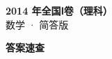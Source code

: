 \documentclass[zihao=-4, a4paper]{ctexart}
\begin{document}
\begin{center}
  {\Large\bfseries 2014 年全国Ⅰ卷（理科）}\\[4pt]
  {\large 数学 · 简答版}
\end{center}
\medskip
{}

\clearpage
{}
\begin{center}{\Large\bfseries 答案速查}\end{center}
\medskip

\end{document}
